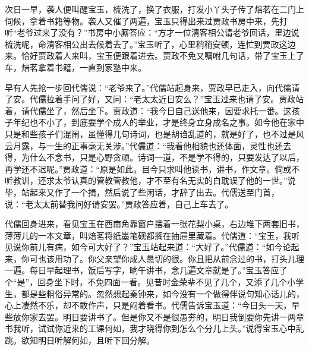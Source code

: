 \begin{parag}
    次日一早，袭人便叫醒宝玉，梳洗了，换了衣服，打发小丫头子传了焙茗在二门上伺候，拿着书籍等物。袭人又催了两遍，宝玉只得出来过贾政书房中来，先打听“老爷过来了没有？”书房中小厮答应：“方才一位清客相公请老爷回话，里边说梳洗呢，命清客相公出去候着去了。”宝玉听了，心里稍稍安顿，连忙到贾政这边来。恰好贾政着人来叫，宝玉便跟着进去。贾政不免又嘱咐几句话，带了宝玉上了车，焙茗拿着书籍，一直到家塾中来。
\end{parag}


\begin{parag}
    早有人先抢一步回代儒说：“老爷来了。”代儒站起身来，贾政早已走入，向代儒请了安。代儒拉着手问了好，又问：“老太太近日安么？”宝玉过来也请了安。贾政站着，请代儒坐了，然后坐下。贾政道：“我今日自己送他来，因要求托一番。这孩子年纪也不小了，到底要学个成人的举业，才是终身立身成名之事。如今他在家中只是和些孩子们混闹，虽懂得几句诗词，也是胡诌乱道的，就是好了，也不过是风云月露，与一生的正事毫无关涉。”代儒道：“我看他相貌也还体面，灵性也还去得，为什么不念书，只是心野贪顽。诗词一道，不是学不得的，只要发达了以后，再学还不迟呢。”贾政道：“原是如此。目今只求叫他读书，讲书，作文章。倘或不听教训，还求太爷认真的管教管教他，才不至有名无实的白耽误了他的一世。”说毕，站起来又作了一个揖，然后说了些闲话，才辞了出去。代儒送至门首，说：“老太太前替我问好请安罢。”贾政答应着，自己上车去了。
\end{parag}


\begin{parag}
    代儒回身进来，看见宝玉在西南角靠窗户摆着一张花梨小桌，右边堆下两套旧书，薄薄儿的一本文章，叫焙茗将纸墨笔砚都搁在抽屉里藏着。代儒道：“宝玉，我听见说你前儿有病，如今可大好了？”宝玉站起来道：“大好了。”代儒道：“如今论起来，你可也该用功了。你父亲望你成人恳切的很。你且把从前念过的书，打头儿理一遍。每日早起理书，饭后写字，晌午讲书，念几遍文章就是了。”宝玉答应了个“是”，回身坐下时，不免四面一看。见昔时金荣辈不见了几个，又添了几个小学生，都是些粗俗异常的。忽然想起秦钟来，如今没有一个做得伴说句知心话儿的，心上凄然不乐，却不敢作声，只是闷着看书。代儒告诉宝玉道：“今日头一天，早些放你家去罢。明日要讲书了。但是你又不是很愚夯的，明日我倒要你先讲一两章书我听，试试你近来的工课何如，我才晓得你到怎么个分儿上头。”说得宝玉心中乱跳。欲知明日听解何如，且听下回分解。
\end{parag}